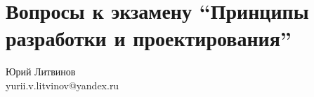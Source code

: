 \documentclass[a5paper]{article}
\begin{document}
\thispagestyle{empty}

\section*{Вопросы к экзамену \enquote{Принципы разработки и проектирования}}

\begin{flushright}\begin{small}Юрий Литвинов\\\small{yurii.v.litvinov@yandex.ru}\end{small}\end{flushright}
\end{document}
